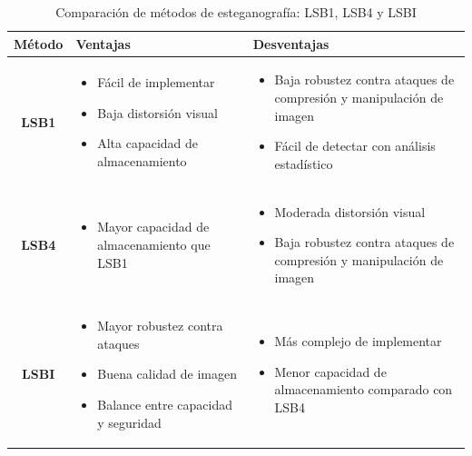 \documentclass[a4paper,12pt]{article}
\begin{document}
\begin{itemize}
\begin{itemize}
		\begin{table}[H]
			\centering
			\begin{tabular}{|c|p{7cm}|p{7cm}|}
				\hline
				\textbf{Método} & \textbf{Ventajas} & \textbf{Desventajas} \\
				\hline
				\textbf{LSB1} & 
				\begin{itemize}
					\item Fácil de implementar
					\item Baja distorsión visual
					\item Alta capacidad de almacenamiento
				\end{itemize} &
				\begin{itemize}
					\item Baja robustez contra ataques de compresión y manipulación de imagen
					\item Fácil de detectar con análisis estadístico
				\end{itemize} \\
				\hline
				\textbf{LSB4} & 
				\begin{itemize}
					\item Mayor capacidad de almacenamiento que LSB1
					
				\end{itemize} &
				\begin{itemize}
					\item Moderada distorsión visual
					\item Baja robustez contra ataques de compresión y manipulación de imagen
				\end{itemize} \\
				\hline
				\textbf{LSBI} & 
				\begin{itemize}
					\item Mayor robustez contra ataques
					\item Buena calidad de imagen
					\item Balance entre capacidad y seguridad
				\end{itemize} &
				\begin{itemize}
					\item Más complejo de implementar
					\item Menor capacidad de almacenamiento comparado con LSB4
				\end{itemize} \\
				\hline
			\end{tabular}
			\caption{Comparación de métodos de esteganografía: LSB1, LSB4 y LSBI}
			\label{tab:comparison}
		\end{table}
		

\end{itemize}
\end{itemize}
\end{document}
